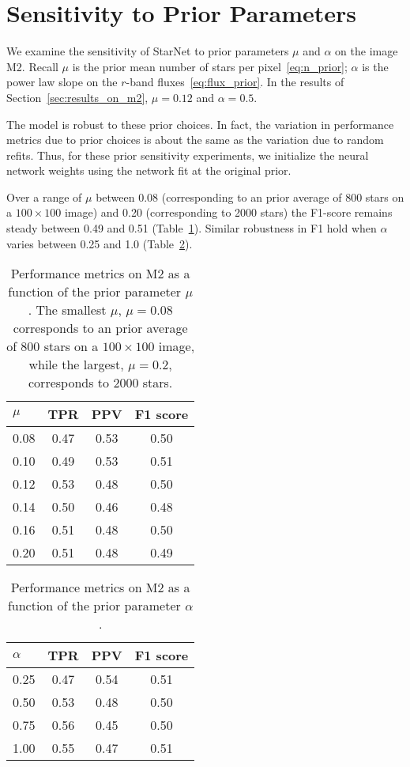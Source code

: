 \section{Sensitivity to Prior Parameters}
\label{sec:prior_sensitivity}

We examine the sensitivity of StarNet to prior parameters $\mu$ and $\alpha$ on the image M2. 
Recall $\mu$ is the prior mean number of stars per pixel~\eqref{eq:n_prior};
$\alpha$ is the power law slope on the $r$-band fluxes~\eqref{eq:flux_prior}. 
In the results of Section~\ref{sec:results_on_m2}, $\mu=0.12$ and  $\alpha = 0.5$. 

The model is robust to these prior choices. 
In fact, the variation in performance metrics
due to prior choices is about the same as the 
variation due to random refits.
Thus, for these prior sensitivity experiments, 
we initialize the neural network weights
using the network fit at the original prior. 

Over a  range of $\mu$ between 0.08 (corresponding to 
an prior average of 800 stars on a $100\times100$ image) 
and 0.20 (corresponding to 2000 stars)
the F1-score remains steady between 0.49 and 0.51 (Table~\ref{tab:mu_sensitivity}). 
Similar robustness in F1 hold when $\alpha$ varies between 
0.25 and 1.0 (Table~\ref{tab:alpha_sensitivity}). 

\begin{table}[!tb]
\centering
\begin{tabular}{l|ccc}
\toprule
$\mu$ &   TPR &   PPV &  F1 score \\
\midrule
0.08 &  0.47 &  0.53 & 0.50 \\
0.10 &  0.49 &  0.53 & 0.51 \\
0.12 &  0.53 &  0.48 & 0.50 \\
0.14 &  0.50 &  0.46 & 0.48 \\
0.16 &  0.51 &  0.48 & 0.50 \\
0.20 &  0.51 &  0.48 & 0.49 \\
\bottomrule
\end{tabular}
\caption{Performance metrics on M2 as a function of 
the prior parameter $\mu$. 
The smallest $\mu$, $\mu = 0.08$ corresponds to 
an prior average of 800 stars on a $100\times100$ image, 
while the largest, $\mu = 0.2$, corresponds to 2000 stars. }
\label{tab:mu_sensitivity}
\end{table}


\begin{table}[!tb]
\centering
\begin{tabular}{l|ccc}
\toprule
$\alpha$ &   TPR &   PPV &  F1 score \\
\midrule
0.25 &  0.47 &  0.54 & 0.51 \\
0.50 &  0.53 &  0.48 & 0.50 \\
0.75 &  0.56 &  0.45 & 0.50 \\
1.00 &  0.55 &  0.47 & 0.51 \\
\bottomrule
\end{tabular}
\caption{Performance metrics on M2 as a function of 
the prior parameter $\alpha$. }
\label{tab:alpha_sensitivity}
\end{table}

